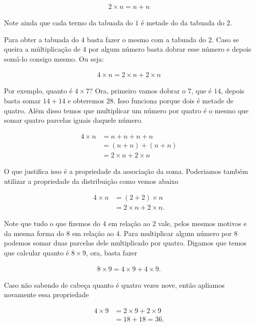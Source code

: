 \begin{align*}
    2\times n=n+n
\end{align*}

Note ainda que cada termo da tabuada do $1$ é metade do da tabuada do $2$.

Para obter a tabuada do $4$ basta fazer o mesmo com a tabuada do $2$. Caso se queira a múltiplicação de $4$ por algum número basta dobrar esse número e depois somá-lo consigo mesmo. Ou seja:

\begin{align*}
    4\times n=2\times n+2\times n
\end{align*}

Por exemplo, quanto é $4\times 7$? Ora, primeiro vamos dobrar o $7$, que é $14$, depois basta somar $14+14$ e obteremos $28$. Isso funciona porque dois é metade de quatro. Além disso temos que multiplicar um número por quatro é o mesmo que somar quatro parcelas iguais daquele número.

\begin{align*}
    4\times n&=n+n+n+n\\
    &=(n+n)+(n+n)\\
    &=2\times n+2\times n
\end{align*}

O que justifica isso é a propriedade da associação da soma. Poderiamos também utilizar a propriedade da distribuição como vemos abaixo

\begin{align*}
    4\times n&=(2+2)\times n\\
    &=2\times n+2\times n.
\end{align*}

Note que tudo o que fizemos do $4$ em relação ao $2$ vale, pelos mesmos motivos e da mesma forma do $8$ em relação ao $4$. Para multiplicar algum número por $8$ podemos somar duas parcelas dele multiplicado por quatro. Digamos que temos que calcular quanto é $8\times 9$, ora, basta fazer

\begin{align*}
    8\times9=4\times 9+4\times9.
\end{align*}

Caso não sabendo de cabeça quanto é quatro vezes nove, então apliamos novamente essa propriedade

\begin{align*}
    4\times9&=2\times 9+2\times9\\
    &=18+18=36.
\end{align*}

